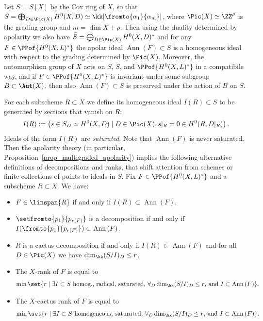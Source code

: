 \documentclass[12pt,a4paper]{article}
\newcommand{\apolar}[1][F]{\operatorname{Ann}\left(#1\right)}
\begin{document}
Let $S= S[X]$ be the Cox ring of $X$,
so that $S=\bigoplus_{D\in \Pic(X)} H^0(X,D) \simeq \kk[\fromto{\alpha_1}{\alpha_m}]$, where $\Pic(X)\simeq \ZZ^{\rho}$ is the grading group and $m= \dim X + \rho$.
Then using the duality determined by apolarity we also have
$\widetilde{S}  = \bigoplus_{D\in \Pic(X)} H^0(X,D)^*$ and for any $F\in \PPof{H^0(X,L)^*}$ the apolar ideal $\apolar\subset S$ is a homogeneous ideal with respect to the grading determined by $\Pic(X)$.
Moreover, the automorphism group of $X$ acts on $S$, $\widetilde{S}$, and $\PPof{H^0(X,L)^*}$ in a compatibile way, and if $F\in \PPof{H^0(X,L)^*}$ is invariant under some subgroup $B\subset \Aut(X)$, then also $\apolar\subset S$ is preserved under the action of $B$ on $S$.

For each subscheme $R\subset X$ we define
its homogeneous ideal $I(R)\subset S$ to be generated by sections that vanish on $R$:
\[
  I(R):=\left(
    s\in S_{D}\simeq H^0(X,D) \mid D\in \Pic(X), s|_{R} = 0 \in H^0(R,D|_{R})
  \right).
\]
Ideals of the form $I(R)$ are \emph{saturated}.
Note that $\apolar$ is never saturated.
Then the apolarity theory
(in particular, Proposition~\ref{prop_multigraded_apolarity})
implies the following alternative definitions of decompositions and ranks, that shift attention from schemes or finite collections of points to ideals in $S$. Fix $F\in \PPof{H^0(X,L)^*}$ and a subscheme $R\subset X$. We have:

\begin{itemize}
 \item $F\in \linspan{R}$ if and only if $I(R)\subset \apolar$.
 \item
 $\setfromto{p_1}{p_{r(F)}}$
   is a decomposition if and only if
   $I(\fromto{p_1}{p_{r(F)}})\subset \apolar$.
 \item
 $R$ is a cactus decomposition
   if and only if
   $I(R) \subset \apolar$ and
   for all $D\in \Pic(X)$ we have
   $\dim_{\kk} (S/I)_D \le r$.
 \item  The $X$-rank of $F$ is equal to
 \[
   \min\set {r \mid
      \exists I\subset S \text{ homog., radical, saturated, } \forall_D \dim_{\kk} (S/I)_D \le r \text{, and }  I \subset \apolar}.
 \]
 \item The $X$-cactus rank of $F$ is equal to
 \[
   \min\set {r \mid
      \exists I\subset S \text{ homogeneous, saturated, } \forall_D \dim_{\kk} (S/I)_D \le r \text{, and }  I \subset \apolar}.
 \]
\end{itemize}
\end{document}
